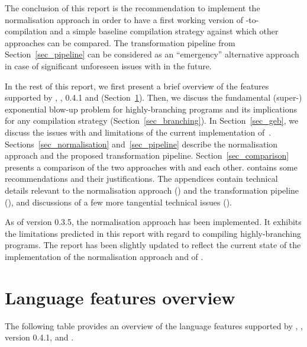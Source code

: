\documentclass[final]{msc}
\begin{document}
The conclusion of this report is the recommendation to implement the
normalisation approach in order to have a first working version of
\Juvix{}-to-\VampIR{} compilation and a simple baseline compilation strategy
against which other approaches can be compared. The transformation
pipeline from Section~\ref{sec_pipeline} can be considered as an
``emergency'' alternative approach in case of significant unforeseen
issues with \Geb{} in the future.

In the rest of this report, we first present a brief overview of the
features supported by \Juvix{}, \JuvixCore{}, \Geb{} 0.4.1 and
\VampIR{} (Section~\ref{sec_features}). Then, we discuss the fundamental
(super-) exponential blow-up problem for highly-branching programs and
its implications for any compilation strategy
(Section~\ref{sec_branching}). In Section~\ref{sec_geb}, we discuss the
issues with and limitations of the current implementation
of~\Geb{}. Sections~\ref{sec_normalisation} and~\ref{sec_pipeline}
describe the normalisation approach and the proposed transformation
pipeline. Section~\ref{sec_comparison} presents a comparison of the
two approaches with \Geb{} and each other. 
contains some recommendations and their justifications. The
appendices contain technical details relevant to the normalisation
approach () and the transformation
pipeline (), and discussions of a
few more tangential technical issues ().

\begin{remark}[Update] As of \Juvix{} version 0.3.5, the normalisation approach
has been implemented. It exhibits the limitations predicted in this
report with regard to compiling highly-branching programs. The report
has been slightly updated to reflect the current state of the
implementation of the normalisation approach and of \Geb{}.
\end{remark}

\section{Language features overview}\label{sec_features}

The following table provides an overview of the language features
supported by \Juvix{}, \JuvixCore{}, \Geb{} version 0.4.1, and \VampIR{}.
\end{document}
